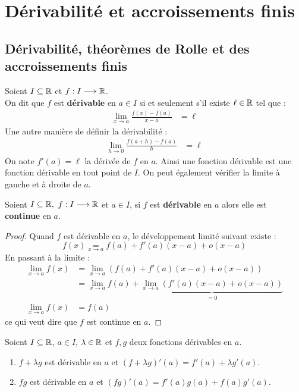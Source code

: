 \chapter{Dérivabilité et accroissements finis}
\def\arraystretch{1}

\section{Dérivabilité, théorèmes de Rolle et des accroissements finis}
\begin{definition}
	Soient $I \subseteq \mathbb{R}$ et $f : I \longrightarrow \mathbb{R}$.
	\\
	On dit que $f$ est \textbf{dérivable} en $a \in I$ si et seulement s'il existe $\ell \in \mathbb{R}$ tel que :
	\begin{align*}
		  \lim_{x \to a} \frac{f(x) - f(a)}{x - a} &= \ell
	\end{align*}
    Une autre manière de définir la dérivabilité :
    \begin{align*}
        \lim_{h \to 0} \frac{f(a + h) - f(a)}{h} &= \ell
    \end{align*}
	On note $f'(a) = \ell$ la dérivée de $f$ en $a$.
	Ainsi une fonction dérivable est une fonction dérivable en tout point de $I$.
	On peut également vérifier la limite à gauche et à droite de $a$.
\end{definition}

\begin{proposition}
	Soient $I \subseteq \mathbb{R},\ f : I \longrightarrow \mathbb{R}$ et $a \in I$, si $f$ est \textbf{dérivable} en $a$ alors elle est \textbf{continue} en $a$.
\end{proposition}

\begin{proof}
	Quand $f$ est dérivable en $a$, le développement limité suivant existe :
	\[ f(x) \underset{x \to a}{=} f(a) + f'(a)(x - a) + o(x - a) \]
	En passant à la limite :
	\begin{align*}
		\lim_{x \to a} f(x) &= \lim_{x \to a} \left( f(a) + f'(a)(x - a) + o(x - a) \right) \\
		&= \lim_{x \to a} f(a) + \underbrace{\lim_{x \to a} \left( f'(a)(x - a) + o(x - a) \right)}_{= 0} \\
		\lim_{x \to a} f(x) &= f(a)
	\end{align*}
	ce qui veut dire que $f$ est continue en $a$.
\end{proof}

\begin{theorem}
	Soient $I \subseteq \mathbb{R}$, $a \in I$, $\lambda \in \mathbb{R}$ et $f, g$ deux fonctions dérivables en $a$.
	\begin{enumerate}
		\item $f + \lambda g$ est dérivable en $a$ et $(f + \lambda g)'(a) = f'(a) + \lambda g'(a)$.
		\item $f g$ est dérivable en $a$ et $(fg)'(a) = f'(a) g(a) + f(a) g'(a)$.
	\end{enumerate}
\end{theorem}

